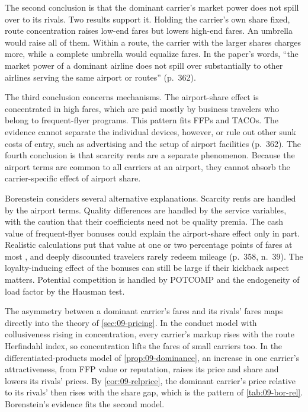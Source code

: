 The second conclusion is that the dominant carrier's market power does not spill over to its rivals. Two
results support it. Holding the carrier's own share fixed, route concentration raises low-end fares but lowers
high-end fares. An umbrella would raise all of them. Within a route, the carrier with the larger shares charges
more, while a complete umbrella would equalize fares. In the paper's words, ``the market power of a dominant
airline does not spill over substantially to other airlines serving the same airport or routes'' (p.~362).

The third conclusion concerns mechanisms. The airport-share effect is concentrated in high fares, which are paid
mostly by business travelers who belong to frequent-flyer programs. This pattern fits FFPs and TACOs. The
evidence cannot separate the individual devices, however, or rule out other sunk costs of entry, such as
advertising and the setup of airport facilities (p.~362). The fourth conclusion is that scarcity rents are a separate
phenomenon. Because the airport terms are common to all carriers at an airport, they cannot absorb the
carrier-specific effect of airport share.

Borenstein considers several alternative explanations. Scarcity rents are handled by the airport terms. Quality
differences are handled by the service variables, with the caution that their coefficients need not be quality
premia. The cash value of frequent-flyer bonuses could explain the airport-share effect only in part. Realistic
calculations put that value at one or two percentage points of fares at most \citep{Borenstein1988}, and deeply
discounted travelers rarely redeem mileage (p.~358, n.~39). The loyalty-inducing effect of the bonuses can still
be large if their kickback aspect matters. Potential competition is handled by POTCOMP and the endogeneity of
load factor by the Hausman test.

The asymmetry between a dominant carrier's fares and its rivals' fares maps directly into the theory of
\cref{sec:09-pricing}. In the conduct model with collusiveness rising in concentration, every carrier's markup
rises with the route Herfindahl index, so concentration lifts the fares of small carriers too. In the
differentiated-products model of \cref{prop:09-dominance}, an increase in one carrier's attractiveness, from
FFP value or reputation, raises its price and share and lowers its rivals' prices. By \cref{cor:09-relprice},
the dominant carrier's price relative to its rivals' then rises with the share gap, which is the pattern of
\cref{tab:09-bor-rel}. Borenstein's evidence fits the second model.


